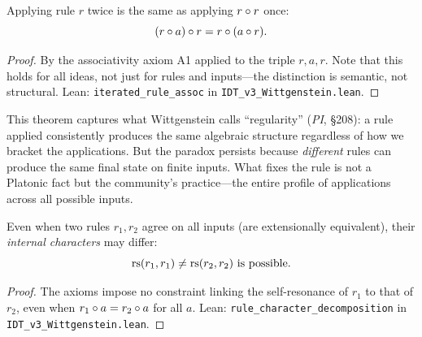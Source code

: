 \begin{theorem}
\label{thm:iterated-rule}
Applying rule $r$ twice is the same as applying $r \circ r$ once:
\[
(r \circ a) \circ r = r \circ (a \circ r).
\]
\end{theorem}

\begin{proof}
By the associativity axiom A1 applied to the triple $r, a, r$. Note that
this holds for all ideas, not just for rules and inputs---the distinction
is semantic, not structural.
Lean: \texttt{iterated\_rule\_assoc} in \texttt{IDT\_v3\_Wittgenstein.lean}.
\end{proof}

\begin{interpretation}
This theorem captures what Wittgenstein calls ``regularity'' (\textit{PI},
\S208): a rule applied consistently produces the same algebraic structure
regardless of how we bracket the applications. But the paradox persists
because \emph{different} rules can produce the same final state on finite
inputs. What fixes the rule is not a Platonic fact but the community's
practice---the entire profile of applications across all possible inputs.
\end{interpretation}

\begin{theorem}
\label{thm:rule-character}
Even when two rules $r_1, r_2$ agree on all inputs (are extensionally
equivalent), their \emph{internal characters} may differ:
\[
\mathrm{rs}(r_1, r_1) \neq \mathrm{rs}(r_2, r_2) \text{ is possible}.
\]
\end{theorem}

\begin{proof}
The axioms impose no constraint linking the self-resonance of $r_1$ to that
of $r_2$, even when $r_1 \circ a = r_2 \circ a$ for all $a$.
Lean: \texttt{rule\_character\_decomposition} in
\texttt{IDT\_v3\_Wittgenstein.lean}.
\end{proof}

